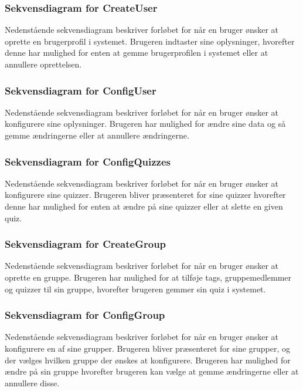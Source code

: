 
\subsubsection{Sekvensdiagram for CreateUser}
Nedenstående sekvensdiagram beskriver forløbet for når en bruger ønsker at oprette en brugerprofil i systemet. Brugeren indtaster sine oplysninger, hvorefter denne har mulighed for enten at gemme brugerprofilen i systemet eller at annullere oprettelsen.


\subsubsection{Sekvensdiagram for ConfigUser}
Nedenstående sekvensdiagram beskriver forløbet for når en bruger ønsker at konfigurere sine oplysninger. Brugeren har mulighed for ændre sine data og så gemme ændringerne eller at annullere ændringerne.


\subsubsection{Sekvensdiagram for ConfigQuizzes}
Nedenstående sekvensdiagram beskriver forløbet for når en bruger ønsker at konfigurere sine quizzer. Brugeren bliver præsenteret for sine quizzer hvorefter denne har mulighed for enten at ændre på sine quizzer eller at slette en given quiz.


\subsubsection{Sekvensdiagram for CreateGroup}
Nedenstående sekvensdiagram beskriver forløbet for når en bruger ønsker at oprette en gruppe. Brugeren har mulighed for at tilføje tags, gruppemedlemmer og quizzer til sin gruppe, hvorefter brugeren gemmer sin quiz i systemet.


\subsubsection{Sekvensdiagram for ConfigGroup}
Nedenstående sekvensdiagram beskriver forløbet for når en bruger ønsker at konfigurere en af sine grupper. Brugeren bliver præsenteret for sine grupper, og der vælges hvilken gruppe der ønskes at konfigurere. Brugeren har mulighed for ændre på sin gruppe hvorefter brugeren kan vælge at gemme ændringerne eller at annullere disse.

